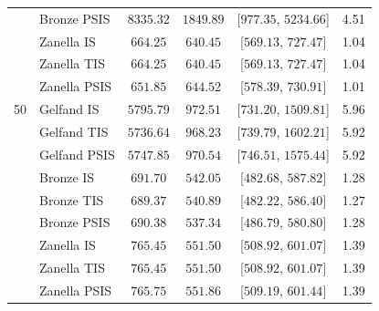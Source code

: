 \begin{table}[ht]
\begin{tabular}{clcccc}
 & Bronze PSIS & $8335.32$ & $1849.89$ & [$977.35$, $5234.66$] & 4.51 \\
 & Zanella IS & $664.25$ & $640.45$ & [$569.13$, $727.47$] & 1.04 \\
 & Zanella TIS & $664.25$ & $640.45$ & [$569.13$, $727.47$] & 1.04 \\
 & Zanella PSIS & $651.85$ & $644.52$ & [$578.39$, $730.91$] & 1.01 \\
\midrule
\multirow{9.5}{*}{50} & Gelfand IS & $5795.79$ & $972.51$ & [$731.20$, $1509.81$] & 5.96 \\
 & Gelfand TIS & $5736.64$ & $968.23$ & [$739.79$, $1602.21$] & 5.92 \\
 & Gelfand PSIS & $5747.85$ & $970.54$ & [$746.51$, $1575.44$] & 5.92 \\
 & Bronze IS & $691.70$ & $542.05$ & [$482.68$, $587.82$] & 1.28 \\
 & Bronze TIS & $689.37$ & $540.89$ & [$482.22$, $586.40$] & 1.27 \\
 & Bronze PSIS & $690.38$ & $537.34$ & [$486.79$, $580.80$] & 1.28 \\
 & Zanella IS & $765.45$ & $551.50$ & [$508.92$, $601.07$] & 1.39 \\
 & Zanella TIS & $765.45$ & $551.50$ & [$508.92$, $601.07$] & 1.39 \\
 & Zanella PSIS & $765.75$ & $551.86$ & [$509.19$, $601.44$] & 1.39 \\
\bottomrule
\end{tabular}
\end{table}
